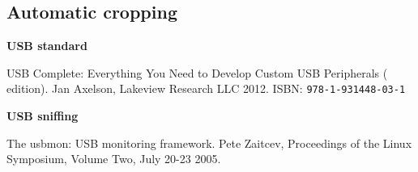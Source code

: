\documentclass{article}
\begin{document}
\subsection{Automatic cropping}

\pagebreak

\renewcommand{\refname}{References}
\begin{thebibliography}{}

  \item[]\hspace{-\labelwidth}\hspace{-\labelsep}\textbf{USB standard}

   USB Complete: Everything You Need to Develop
               Custom USB Peripherals ( edition).
               Jan Axelson, Lakeview Research LLC 2012.
               ISBN: {\tt   978-1-931448-03-1}
               
  \item[]\hspace{-\labelwidth}\hspace{-\labelsep}\textbf{USB sniffing}
  
   The usbmon: USB monitoring framework. Pete Zaitcev,
  Proceedings of the Linux Symposium, Volume Two, July 20-23 2005.
  \setcounter{firstbib}{\value{enumiv}}
\end{thebibliography}
\end{document}
